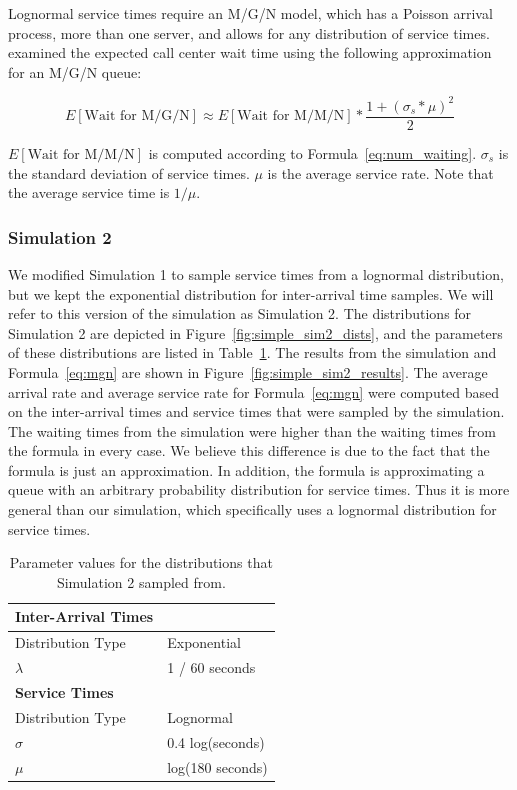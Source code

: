 Lognormal service times require an M/G/N model, which has a Poisson arrival
process, more than one server, and allows for any distribution of service times.
\citet{queue1} examined the expected call center wait time using the
following approximation for an M/G/N queue:

\begin{equation}
  E[\text{Wait for M/G/N}] \approx E[\text{Wait for M/M/N}] *
  \frac{1 + (\sigma_s * \mu)^2}{2}
\label{eq:mgn}
\end{equation}

$E[\text{Wait for M/M/N}]$ is computed according to
Formula~\ref{eq:num_waiting}.
$\sigma_s$ is the standard deviation of service times.
$\mu$ is the average service rate.
Note that the average service time is $1/\mu$.

\subsubsection{Simulation 2}

We modified Simulation 1 to sample service times from a lognormal
distribution, but we kept the exponential distribution for inter-arrival time
samples.
We will refer to this version of the simulation as Simulation 2.
The distributions for Simulation 2 are depicted in
Figure~\ref{fig:simple_sim2_dists}, and the parameters of these distributions
are listed in Table~\ref{tab:sim2_params}.
The results from the simulation and Formula~\ref{eq:mgn} are shown in
Figure~\ref{fig:simple_sim2_results}.
The average arrival rate and average service rate for Formula~\ref{eq:mgn} were
computed based on the inter-arrival times and service times that were sampled by
the simulation.
The waiting times from the simulation were higher than the waiting times from
the formula in every case.
We believe this difference is due to the fact that the formula is just an
approximation.
In addition, the formula is approximating a queue with an arbitrary probability
distribution for service times.
Thus it is more general than our simulation, which specifically uses a lognormal
distribution for service times.

\begin{table}
  \begin{tabular}{|l|l|}
    \hline
    \textbf{Inter-Arrival Times} & \\
    \hline
    Distribution Type & Exponential\\
    \hline
    $\lambda$ & 1 / 60 seconds\\
    \hline
    \hline
    \textbf{Service Times} & \\
    \hline
    Distribution Type & Lognormal\\
    \hline
    $\sigma$ & 0.4 log(seconds)\\
    \hline
    $\mu$ & log(180 seconds)\\
    \hline
  \end{tabular}
  \caption{Parameter values for the distributions that Simulation 2 sampled
    from.}\label{tab:sim2_params}
\end{table}

